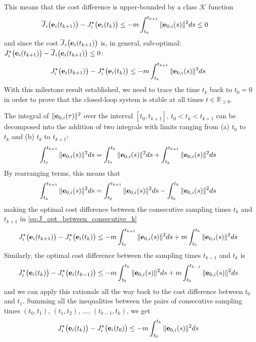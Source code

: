 This means that the cost difference is upper-bounded by a class $\mathcal{K}$
function
\begin{align}
  \overline{J}_i\big(\bm{\mathbf{e}}_i(t_{k+1})\big) - J_i^{\star}\big(\bm{\mathbf{e}}_i(t_k)\big)
  &\leq -m \int_{t_k}^{t_{k+1}} \|\bm{\mathbf{e}}_{0,i}(s)\|^2 ds \leq 0
\end{align}
and since the cost $\overline{J}_i\big(\bm{\mathbf{e}}_i(t_{k+1})\big)$ is, in general,
sub-optimal: $J_i^{\star}\big(\bm{\mathbf{e}}_i(t_{k+1})\big) - \overline{J}_i\big(\bm{\mathbf{e}}_i(t_{k+1})\big) \leq 0$:
\begin{align}
 J_i^{\star}\big(\bm{\mathbf{e}}_i(t_{k+1})\big) - J_i^{\star}\big(\bm{\mathbf{e}}_i(t_k)\big) \leq -m \int_{t_k}^{t_{k+1}} \|\bm{\mathbf{e}}_{0,i}(s)\|^2 ds
 \label{eq:J_opt_between_consecutive_k}
\end{align}
With this milestone result established, we need to trace the time $t_k$ back
to $t_0 = 0$ in order to prove that the closed-loop system is stable at all
times $t \in \mathbb{R}_{\geq 0}$.

\begin{gg_box}
  The integral of $\|\bm{\mathbf{e}}_{0,i}(\tau)\|^2$ over the interval $[t_0, t_{k+1}]$,
  $t_0 < t_k < t_{k+1}$ can be decomposed into the addition of two integrals
  with limits ranging from (a) $t_0$ to $t_k$ and (b) $t_k$ to $t_{k+1}$:
  \begin{align}
    \int_{t_0}^{t_{k+1}} \|\bm{\mathbf{e}}_{0,i}(s)\|^2 ds = \int_{t_0}^{t_{k}} \|\bm{\mathbf{e}}_{0,i}(s)\|^2 ds + \int_{t_k}^{t_{k+1}} \|\bm{\mathbf{e}}_{0,i}(s)\|^2 ds
  \end{align}
  By rearranging terms, this means that
  \begin{align}
    \int_{t_k}^{t_{k+1}} \|\bm{\mathbf{e}}_{0,i}(s)\|^2 ds = \int_{t_0}^{t_{k+1}} \|\bm{\mathbf{e}}_{0,i}(s)\|^2 ds - \int_{t_0}^{t_{k}} \|\bm{\mathbf{e}}_{0,i}(s)\|^2 ds
  \end{align}
  making the optimal cost difference between the consecutive sampling times
  $t_k$ and $t_{k+1}$ in \eqref{eq:J_opt_between_consecutive_k}
  \begin{align}
    J_i^{\star}\big(\bm{\mathbf{e}}_i(t_{k+1})\big) - J_i^{\star}\big(\bm{\mathbf{e}}_i(t_k)\big) \leq
      -m \int_{t_0}^{t_{k+1}} \|\bm{\mathbf{e}}_{0,i}(s)\|^2 ds +m \int_{t_0}^{t_{k}} \|\bm{\mathbf{e}}_{0,i}(s)\|^2 ds
  \end{align}
  Similarly, the optimal cost difference between the sampling times $t_{k-1}$
  and $t_{k}$ is
  \begin{align}
    J_i^{\star}\big(\bm{\mathbf{e}}_i(t_{k})\big) - J_i^{\star}\big(\bm{\mathbf{e}}_i(t_{k-1})\big) \leq
      -m \int_{t_0}^{t_{k}} \|\bm{\mathbf{e}}_{0,i}(s)\|^2 ds +m \int_{t_0}^{t_{k-1}} \|\bm{\mathbf{e}}_{0,i}(s)\|^2 ds
  \end{align}
  and we can apply this rationale all the way back to the cost difference
  between $t_0$ and $t_1$. Summing all the inequalities between the pairs of
  consecutive sampling times $(t_0, t_1)$, $(t_1, t_2)$, $\dots$,
  $(t_{k-1}, t_k)$, we get
  \begin{align}
    J_i^{\star}\big(\bm{\mathbf{e}}_i(t_{k})\big) - J_i^{\star}\big(\bm{\mathbf{e}}_i(t_0)\big) \leq
      -m \int_{t_0}^{t_{k}} \|\bm{\mathbf{e}}_{0,i}(s)\|^2 ds
  \end{align}
\end{gg_box}

